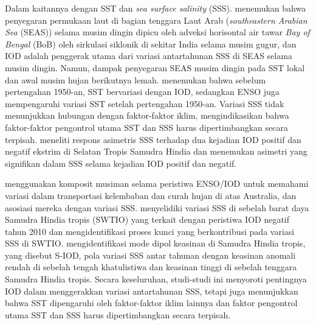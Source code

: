 \begin{spacing}{1.5}
	Dalam kaitannya dengan SST dan \textit{sea surface salinity} (SSS).  menemukan bahwa penyegaran permukaan laut di bagian tenggara Laut Arab (\textit{southeastern Arabian Sea} (SEAS)) selama musim dingin dipicu oleh adveksi horisontal air tawar \textit{Bay of Bengal} (BoB) oleh sirkulasi siklonik di sekitar India selama musim gugur, dan IOD adalah penggerak utama dari variasi antartahunan SSS di SEAS selama musim dingin. Namun, dampak penyegaran SEAS musim dingin pada SST lokal dan awal musim hujan berikutnya lemah.  menemukan bahwa sebelum pertengahan 1950-an, SST bervariasi dengan IOD, sedangkan ENSO juga mempengaruhi variasi SST setelah pertengahan 1950-an. Variasi SSS tidak menunjukkan hubungan dengan faktor-faktor iklim, mengindikasikan bahwa faktor-faktor pengontrol utama SST dan SSS harus dipertimbangkan secara terpisah.  meneliti respons asimetris SSS terhadap dua kejadian IOD positif dan negatif ekstrim di Selatan Tropis Samudra Hindia dan menemukan asimetri yang signifikan dalam SSS selama kejadian IOD positif dan negatif.
	
	 menggunakan komposit musiman selama peristiwa ENSO/IOD untuk memahami variasi dalam transportasi kelembaban dan curah hujan di atas Australia, dan asosiasi mereka dengan variasi SSS.  menyelidiki variasi SSS di sebelah barat daya Samudra Hindia tropis (SWTIO) yang terkait dengan peristiwa IOD negatif tahun 2010 dan mengidentifikasi proses kunci yang berkontribusi pada variasi SSS di SWTIO.  mengidentifikasi mode dipol keasinan di Samudra Hindia tropis, yang disebut S-IOD, pola variasi SSS antar tahunan dengan keasinan anomali rendah di sebelah tengah khatulistiwa dan keasinan tinggi di sebelah tenggara Samudra Hindia tropis. Secara keseluruhan, studi-studi ini menyoroti pentingnya IOD dalam menggerakkan variasi antartahunan SSS, tetapi juga menunjukkan bahwa SST dipengaruhi oleh faktor-faktor iklim lainnya dan faktor pengontrol utama SST dan SSS harus dipertimbangkan secara terpisah.
	

\end{spacing}

